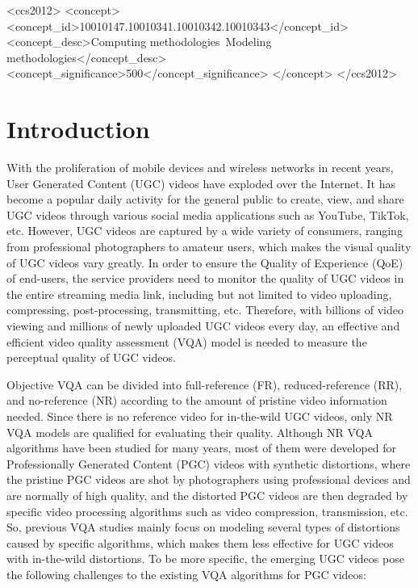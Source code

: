 \documentclass[sigconf]{acmart}
\begin{document}
\begin{CCSXML}
<ccs2012>
   <concept>
       <concept_id>10010147.10010341.10010342.10010343</concept_id>
       <concept_desc>Computing methodologies~Modeling methodologies</concept_desc>
       <concept_significance>500</concept_significance>
       </concept>
 </ccs2012>
\end{CCSXML}





\maketitle

\section{Introduction}
\label{introduction}
With the proliferation of mobile devices and wireless networks in recent years, User Generated Content (UGC) videos have exploded over the Internet. It has become a popular daily activity for the general public to create, view, and share UGC videos through various social media applications such as YouTube, TikTok, etc. 
However, UGC videos are captured by a wide variety of consumers, ranging from professional photographers to amateur users, which makes the visual quality of UGC videos vary greatly. In order to ensure the Quality of Experience (QoE) of end-users, the service providers need to monitor the quality of UGC videos in the entire streaming media link, including but not limited to video uploading, compressing, post-processing, transmitting, etc. Therefore, with billions of video viewing and millions of newly uploaded UGC videos every day, an effective and efficient video quality assessment (VQA) model is needed to measure the perceptual quality of UGC videos.

Objective VQA can be divided into full-reference (FR), reduced-reference (RR), and no-reference (NR) according to the amount of pristine video information needed. Since there is no reference video for in-the-wild UGC videos, only NR VQA models are qualified for evaluating their quality. Although NR VQA algorithms \cite{saad2014blind,mittal2015completely,min2020study} have been studied for many years, most of them were developed for Professionally Generated Content (PGC) videos with synthetic distortions, where the pristine PGC videos are shot by photographers using professional devices and are normally of high quality, and the distorted PGC videos are then degraded by specific video processing algorithms such as video compression, transmission, etc. So, previous VQA studies mainly focus on modeling several types of distortions caused by specific algorithms, which makes them less effective for UGC videos with in-the-wild distortions. To be more specific, the emerging UGC videos pose the following challenges to the existing VQA algorithms for PGC videos:
\end{document}
